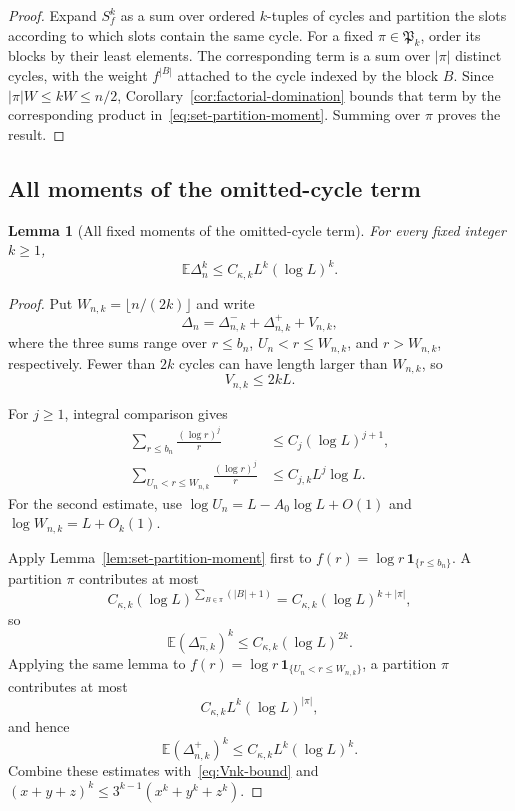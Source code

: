 \documentclass[11pt]{article}
\newtheorem{lemma}[theorem]{Lemma}
\theoremstyle{remark}
\newcommand{\Ee}{\mathbb E}
\newcommand{\one}{\mathbf 1}
\begin{document}
\begin{proof}
Expand $S_f^k$ as a sum over ordered $k$-tuples of cycles and partition the
slots according to which slots contain the same cycle.  For a fixed
$\pi\in\mathfrak P_k$, order its blocks by their least elements.  The
corresponding term is a sum over $|\pi|$ distinct cycles, with the weight
$f^{|B|}$ attached to the cycle indexed by the block $B$.  Since
$|\pi|W\le kW\le n/2$, Corollary~\ref{cor:factorial-domination} bounds that
term by the corresponding product in~\eqref{eq:set-partition-moment}.
Summing over $\pi$ proves the result.
\end{proof}

\subsection{All moments of the omitted-cycle term}

\begin{lemma}[All fixed moments of the omitted-cycle term]
\label{lem:Delta-all-moments}
For every fixed integer $k\ge1$,
\begin{equation}
\label{eq:Delta-all-moments}
 \Ee\Delta_n^k\le C_{\kappa,k}L^k(\log L)^k.
\end{equation}
\end{lemma}

\begin{proof}
Put $W_{n,k}=\lfloor n/(2k)\rfloor$ and write
\[
 \Delta_n=\Delta_{n,k}^-+\Delta_{n,k}^++V_{n,k},
\]
where the three sums range over $r\le b_n$,
$U_n<r\le W_{n,k}$, and $r>W_{n,k}$, respectively.  Fewer than $2k$
cycles can have length larger than $W_{n,k}$, so
\begin{equation}
\label{eq:Vnk-bound}
 V_{n,k}\le2kL.
\end{equation}

For $j\ge1$, integral comparison gives
\begin{align}
 \sum_{r\le b_n}\frac{(\log r)^j}{r}
 &\le C_j(\log L)^{j+1},
 \label{eq:small-omitted-sum}\\
 \sum_{U_n<r\le W_{n,k}}\frac{(\log r)^j}{r}
 &\le C_{j,k}L^j\log L.
 \label{eq:upper-omitted-sum}
\end{align}
For the second estimate, use
$\log U_n=L-A_0\log L+O(1)$ and
$\log W_{n,k}=L+O_k(1)$.

Apply Lemma~\ref{lem:set-partition-moment} first to
$f(r)=\log r\,\one_{\{r\le b_n\}}$.  A partition $\pi$ contributes at most
\[
 C_{\kappa,k}(\log L)^{\sum_{B\in\pi}(|B|+1)}
 =C_{\kappa,k}(\log L)^{k+|\pi|},
\]
so
\[
 \Ee(\Delta_{n,k}^-)^k\le C_{\kappa,k}(\log L)^{2k}.
\]
Applying the same lemma to
$f(r)=\log r\,\one_{\{U_n<r\le W_{n,k}\}}$, a partition $\pi$ contributes
at most
\[
 C_{\kappa,k}L^k(\log L)^{|\pi|},
\]
and hence
\[
 \Ee(\Delta_{n,k}^+)^k
 \le C_{\kappa,k}L^k(\log L)^k.
\]
Combine these estimates with~\eqref{eq:Vnk-bound} and
$(x+y+z)^k\le3^{k-1}(x^k+y^k+z^k)$.
\end{proof}
\end{document}
